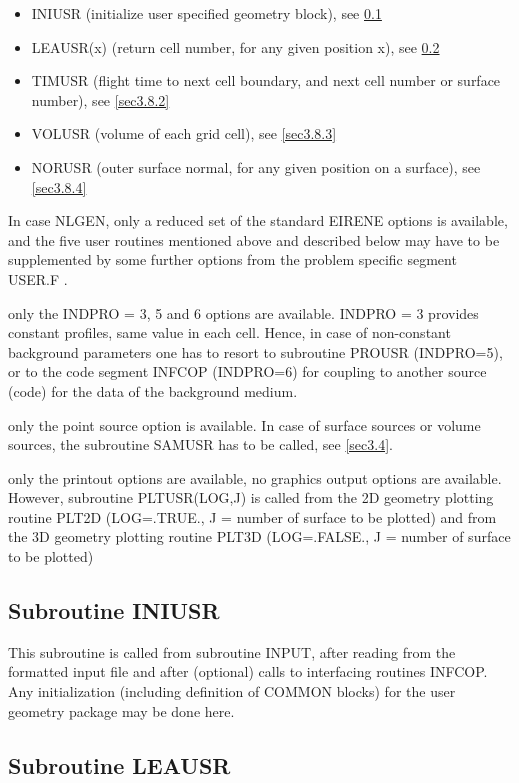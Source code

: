 \begin{itemize}
\item
INIUSR (initialize user specified geometry block), see \ref{sec3.8.0}
\item
LEAUSR(x) (return cell number, for any given position x), see
\ref{sec3.8.1}
\item
TIMUSR (flight time to next cell boundary, and next cell number
or surface number), see \ref{sec3.8.2}
\item
VOLUSR (volume of each grid cell),
see \ref{sec3.8.3}
\item
NORUSR (outer surface normal, for any given position on a surface),
see \ref{sec3.8.4}
\end{itemize}
In case NLGEN, only a reduced set of the standard EIRENE options is available, and the
five user routines mentioned above and described below may have to be
supplemented by some further options from
the problem specific segment USER.F .
\begin{list}{ }{}
\item[{\bf Input block 5 }]

only the INDPRO = 3, 5 and 6 options are available. INDPRO = 3 provides
constant profiles, same value in each cell.  Hence, in case of
non-constant
background parameters one has to resort to subroutine PROUSR
(INDPRO=5), or to the code segment INFCOP (INDPRO=6) for coupling to another
source (code) for the data of the background medium.
\item[{\bf Input block 7 }]
only the point source option is available. In case of surface
sources or volume sources, the subroutine SAMUSR has to be called,
see \ref{sec3.4}.
\item[{\bf Input block 11 }]
only the printout options are available, no graphics output
options are available. However, subroutine PLTUSR(LOG,J) is called
from the 2D geometry plotting routine PLT2D (LOG=.TRUE., J = number of
surface to be plotted) and
from the 3D geometry plotting routine PLT3D (LOG=.FALSE., J =
number of surface to be plotted)
\end{list}
\subsection{Subroutine INIUSR}
\label{sec3.8.0} This subroutine is called from subroutine INPUT,
after reading from the formatted input file and after (optional)
calls to interfacing routines INFCOP. Any initialization
(including definition of COMMON blocks) for the user geometry
package may be done here.
\subsection{Subroutine LEAUSR}
\label{sec3.8.1}

